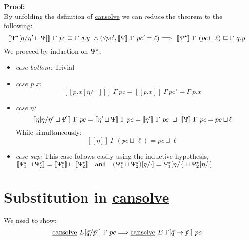\documentclass[12pt,a4paper,twoside]{book}
\newcommand{\llbracket}{[\![}
\newcommand{\rrbracket}{]\!]}
\begin{document}
\begin{appendices}
\noindent \textbf{Proof:}\\
By unfolding the definition of \underline{cansolve} we can reduce the theorem to the following:
$$
\llbracket \Uppsi^\star[\eta/\eta' \sqcup \Uppsi]\rrbracket~\Gamma~pc \sqsubseteq \Gamma~q.y~
\land (\forall pc', \llbracket \Uppsi \rrbracket~\Gamma~pc'=\ell)\Longrightarrow~
\llbracket \Uppsi^\star\rrbracket~\Gamma~(pc \sqcup \ell) \sqsubseteq \Gamma~q.y
$$
We proceed by induction on $\Uppsi^\star$:
\begin{itemize}
\item \emph{case bottom:} Trivial
\item \emph{case p.x:} 
$$
\llbracket p.x[\eta/\cdot]\rrbracket~\Gamma~pc =\llbracket p.x\rrbracket~\Gamma~pc' = \Gamma~p.x
$$
\item \emph{case $\eta$:} 
$$
\llbracket \eta[\eta/\eta' \sqcup \Uppsi]\rrbracket~\Gamma~pc =
\llbracket \eta' \sqcup \Uppsi \rrbracket~\Gamma~pc =
\llbracket \eta'\rrbracket~\Gamma~pc~\sqcup~
\llbracket \Uppsi \rrbracket~\Gamma~pc =
pc \sqcup \ell
$$
While simultaneously:
$$
\llbracket \eta\rrbracket~\Gamma~(pc\sqcup\ell) = pc \sqcup\ell
$$
\item \emph{case sup:} This case follows easily using the inductive hypothesis,\\
$\llbracket \Uppsi_1^\star \sqcup \Uppsi_2^\star \rrbracket = 
\llbracket \Uppsi_1^\star \rrbracket \sqcup \llbracket \Uppsi_2^\star \rrbracket \quad\text{and}\quad
(\Uppsi_1^\star \sqcup \Uppsi_2^\star)[\eta/\cdot]= 
\Uppsi_1^\star [\eta/\cdot]\sqcup \Uppsi_2^\star[\eta/\cdot]$
\end{itemize}

\section{Substitution in \underline{cansolve}}
\label{appdix:rec:cansolve_sub}
We need to show:
$$
\text{\underline{cansolve}}~E[\vec{q}/\vec{p}~]~\Gamma~pc
\Longrightarrow \text{\underline{cansolve}}~E~\Gamma[\vec{q}\mapsto\vec{p}~]~pc
$$


\end{appendices}
\end{document}
